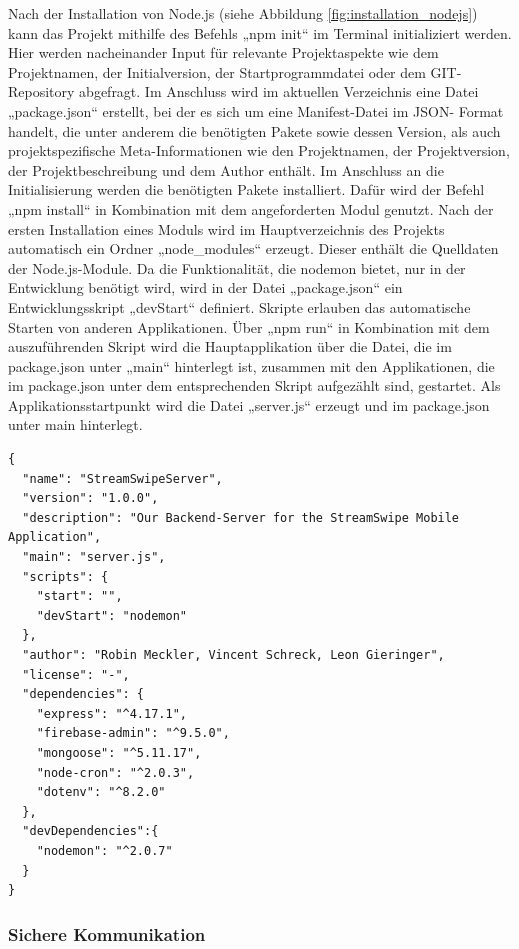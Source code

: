 \noindent
Nach der Installation von Node.js (siehe Abbildung \ref{fig:installation_nodejs}) kann das Projekt mithilfe des Befehls „npm init“ im Terminal initializiert werden. 
Hier werden nacheinander Input für relevante Projektaspekte wie dem Projektnamen, der Initialversion, der Startprogrammdatei oder dem GIT-Repository abgefragt.  
Im Anschluss wird im aktuellen Verzeichnis eine Datei „package.json“ erstellt,  bei der es sich um eine Manifest-Datei im JSON- Format handelt, die unter anderem die benötigten Pakete sowie dessen Version, als auch projektspezifische Meta-Informationen wie den Projektnamen, der Projektversion, der Projektbeschreibung und dem Author enthält.
\newline
Im Anschluss an die Initialisierung werden die benötigten Pakete installiert. Dafür wird der Befehl „npm install“ in Kombination mit dem angeforderten Modul genutzt. 
Nach der ersten Installation eines Moduls wird im Hauptverzeichnis des Projekts automatisch ein Ordner „node\_modules“ erzeugt. Dieser enthält die Quelldaten der Node.js-Module. 
\newline
Da die Funktionalität, die nodemon bietet, nur in der Entwicklung benötigt wird, wird in der Datei „package.json“ ein Entwicklungsskript „devStart“ definiert. 
Skripte erlauben das automatische Starten von anderen Applikationen. Über „npm run“ in Kombination mit dem auszuführenden Skript wird die Hauptapplikation über die Datei, die im package.json unter „main“ hinterlegt ist, zusammen mit den Applikationen, die im package.json unter dem entsprechenden Skript aufgezählt sind, gestartet.
\newline
Als Applikationsstartpunkt wird die Datei „server.js“ erzeugt und im package.json unter main hinterlegt. 

\begin{lstlisting}[caption=Datei package.json, label=lst:packagejson]
{
  "name": "StreamSwipeServer",
  "version": "1.0.0",
  "description": "Our Backend-Server for the StreamSwipe Mobile Application",
  "main": "server.js",
  "scripts": {
    "start": "",
    "devStart": "nodemon"
  },
  "author": "Robin Meckler, Vincent Schreck, Leon Gieringer",
  "license": "-",
  "dependencies": {
    "express": "^4.17.1",
    "firebase-admin": "^9.5.0",
    "mongoose": "^5.11.17",
    "node-cron": "^2.0.3",
    "dotenv": "^8.2.0"
  },
  "devDependencies":{
    "nodemon": "^2.0.7"
  }
}
\end{lstlisting}

\subsubsection{Sichere Kommunikation}

